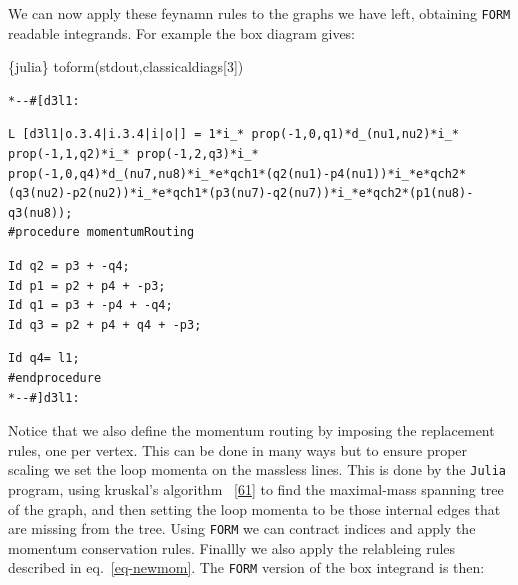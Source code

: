 \documentclass[
  11pt,
  a4paper,
  DIV=11,
  numbers=noendperiod,
  twoside]{scrreprt}
\newenvironment{Shaded}{\begin{snugshade}}{\end{snugshade}}
\newcommand{\DecValTok}[1]{\textcolor[rgb]{0.68,0.00,0.00}{#1}}
\newcommand{\InformationTok}[1]{\textcolor[rgb]{0.37,0.37,0.37}{#1}}
\newcommand{\NormalTok}[1]{\textcolor[rgb]{0.00,0.23,0.31}{#1}}
\DeclareRobustCommand{\[}{\begin{equation}}
\DeclareRobustCommand{\]}{\end{equation}}
\begin{document}
We can now apply these feynamn rules to the graphs we have left,
obtaining \texttt{FORM} readable integrands. For example the box diagram
gives:

\begin{Shaded}
\begin{Highlighting}[]
\InformationTok{\textasciigrave{}\textasciigrave{}\textasciigrave{}\{julia\}}
\NormalTok{toform(stdout,classicaldiags[}\DecValTok{3}\NormalTok{])}
\InformationTok{\textasciigrave{}\textasciigrave{}\textasciigrave{}}
\end{Highlighting}
\end{Shaded}

\begin{verbatim}
*--#[d3l1:
\end{verbatim}

\begin{verbatim}
L [d3l1|o.3.4|i.3.4|i|o|] = 1*i_* prop(-1,0,q1)*d_(nu1,nu2)*i_* prop(-1,1,q2)*i_* prop(-1,2,q3)*i_* prop(-1,0,q4)*d_(nu7,nu8)*i_*e*qch1*(q2(nu1)-p4(nu1))*i_*e*qch2*(q3(nu2)-p2(nu2))*i_*e*qch1*(p3(nu7)-q2(nu7))*i_*e*qch2*(p1(nu8)-q3(nu8));
#procedure momentumRouting
\end{verbatim}

\begin{verbatim}
Id q2 = p3 + -q4;
Id p1 = p2 + p4 + -p3;
Id q1 = p3 + -p4 + -q4;
Id q3 = p2 + p4 + q4 + -p3;
\end{verbatim}

\begin{verbatim}
Id q4= l1;
#endprocedure
*--#]d3l1:
\end{verbatim}

Notice that we also define the momentum routing by imposing the
replacement rules, one per vertex. This can be done in many ways but to
ensure proper scaling we set the loop momenta on the massless lines.
This is done by the \texttt{Julia} program, using kruskal's algorithm
~{[}\protect\hyperlink{ref-Kruskal:1956}{61}{]} to find the maximal-mass
spanning tree of the graph, and then setting the loop momenta to be
those internal edges that are missing from the tree. Using \texttt{FORM}
we can contract indices and apply the momentum conservation rules.
Finallly we also apply the relableing rules described in
eq.~\ref{eq-newmom}. The \texttt{FORM} version of the box integrand is
then:
\end{document}
